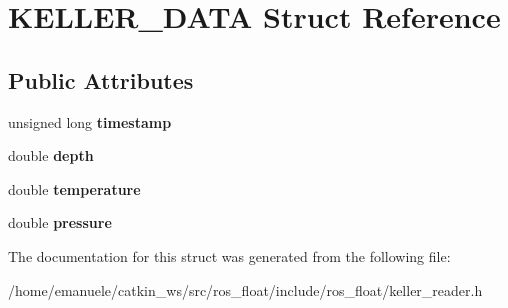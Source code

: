 \hypertarget{structKELLER__DATA}{}\section{K\+E\+L\+L\+E\+R\+\_\+\+D\+A\+TA Struct Reference}
\label{structKELLER__DATA}
\subsection*{Public Attributes}
\begin{DoxyCompactItemize}
\item 
\mbox{\label{structKELLER__DATA_a3ba762f671afd7a08a999df8553fc17e}} 
unsigned long {\bfseries timestamp}
\item 
\mbox{\label{structKELLER__DATA_a146db119626551b896f98a959efe706d}} 
double {\bfseries depth}
\item 
\mbox{\label{structKELLER__DATA_a19a08dde72e5c43f3bb85423f70b8baa}} 
double {\bfseries temperature}
\item 
\mbox{\label{structKELLER__DATA_ae65eb30765f03627278204e9da18c9b8}} 
double {\bfseries pressure}
\end{DoxyCompactItemize}


The documentation for this struct was generated from the following file\+:\begin{DoxyCompactItemize}
\item 
/home/emanuele/catkin\+\_\+ws/src/ros\+\_\+float/include/ros\+\_\+float/keller\+\_\+reader.\+h\end{DoxyCompactItemize}
